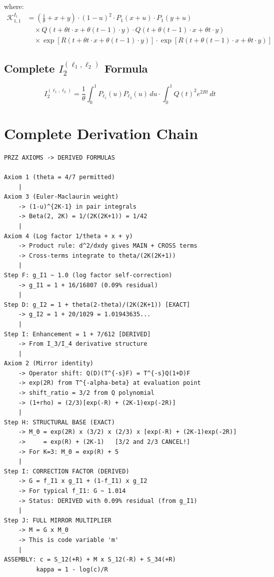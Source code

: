 \documentclass[11pt]{article}
\begin{document}
where:
\begin{align}
\mathcal{K}^{I_1}_{1,1} &= \left(\frac{1}{\theta} + x + y\right) \cdot (1-u)^2 \cdot P_1(x+u) \cdot P_1(y+u) \\
&\quad \times Q(t + \theta t \cdot x + \theta(t-1) \cdot y) \cdot Q(t + \theta(t-1) \cdot x + \theta t \cdot y) \\
&\quad \times \exp\left[R(t + \theta t \cdot x + \theta(t-1) \cdot y)\right] \cdot \exp\left[R(t + \theta(t-1) \cdot x + \theta t \cdot y)\right]
\end{align}

\subsection{Complete $I_2^{(\ell_1,\ell_2)}$ Formula}

\begin{equation}
I_2^{(\ell_1,\ell_2)} = \frac{1}{\theta} \int_0^1 P_{\ell_1}(u) P_{\ell_2}(u) \, du \cdot \int_0^1 Q(t)^2 e^{2Rt} \, dt
\end{equation}

\section{Complete Derivation Chain}
\label{app:chain}

\begin{verbatim}
PRZZ AXIOMS -> DERIVED FORMULAS

Axiom 1 (theta = 4/7 permitted)
    |
Axiom 3 (Euler-Maclaurin weight)
    -> (1-u)^{2K-1} in pair integrals
    -> Beta(2, 2K) = 1/(2K(2K+1)) = 1/42
    |
Axiom 4 (Log factor 1/theta + x + y)
    -> Product rule: d^2/dxdy gives MAIN + CROSS terms
    -> Cross-terms integrate to theta/(2K(2K+1))
    |
Step F: g_I1 ~ 1.0 (log factor self-correction)
    -> g_I1 = 1 + 16/16807 (0.09% residual)
    |
Step D: g_I2 = 1 + theta(2-theta)/(2K(2K+1)) [EXACT]
    -> g_I2 = 1 + 20/1029 = 1.01943635...
    |
Step I: Enhancement = 1 + 7/612 [DERIVED]
    -> From I_3/I_4 derivative structure
    |
Axiom 2 (Mirror identity)
    -> Operator shift: Q(D)(T^{-s}F) = T^{-s}Q(1+D)F
    -> exp(2R) from T^{-alpha-beta} at evaluation point
    -> shift_ratio = 3/2 from Q polynomial
    -> (1+rho) = (2/3)[exp(-R) + (2K-1)exp(-2R)]
    |
Step H: STRUCTURAL BASE (EXACT)
    -> M_0 = exp(2R) x (3/2) x (2/3) x [exp(-R) + (2K-1)exp(-2R)]
    ->     = exp(R) + (2K-1)   [3/2 and 2/3 CANCEL!]
    -> For K=3: M_0 = exp(R) + 5
    |
Step I: CORRECTION FACTOR (DERIVED)
    -> G = f_I1 x g_I1 + (1-f_I1) x g_I2
    -> For typical f_I1: G ~ 1.014
    -> Status: DERIVED with 0.09% residual (from g_I1)
    |
Step J: FULL MIRROR MULTIPLIER
    -> M = G x M_0
    -> This is code variable 'm'
    |
ASSEMBLY: c = S_12(+R) + M x S_12(-R) + S_34(+R)
         kappa = 1 - log(c)/R
\end{verbatim}
\end{document}
